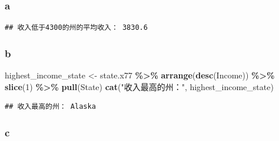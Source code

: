 \documentclass[
]{article}
\newenvironment{Shaded}{\begin{snugshade}}{\end{snugshade}}
\newcommand{\AttributeTok}[1]{\textcolor[rgb]{0.13,0.29,0.53}{#1}}
\newcommand{\DecValTok}[1]{\textcolor[rgb]{0.00,0.00,0.81}{#1}}
\newcommand{\FunctionTok}[1]{\textcolor[rgb]{0.13,0.29,0.53}{\textbf{#1}}}
\newcommand{\NormalTok}[1]{#1}
\newcommand{\OtherTok}[1]{\textcolor[rgb]{0.56,0.35,0.01}{#1}}
\newcommand{\SpecialCharTok}[1]{\textcolor[rgb]{0.81,0.36,0.00}{\textbf{#1}}}
\newcommand{\StringTok}[1]{\textcolor[rgb]{0.31,0.60,0.02}{#1}}
\begin{document}
\subsubsection{a}\label{a-1}

\begin{Shaded}
\end{Shaded}

\begin{verbatim}
## 收入低于4300的州的平均收入： 3830.6
\end{verbatim}

\subsubsection{b}\label{b-1}

\begin{Shaded}
\begin{Highlighting}[]
\NormalTok{highest\_income\_state }\OtherTok{\textless{}{-}}\NormalTok{ state.x77 }\SpecialCharTok{\%\textgreater{}\%} 
  \FunctionTok{arrange}\NormalTok{(}\FunctionTok{desc}\NormalTok{(Income)) }\SpecialCharTok{\%\textgreater{}\%} 
  \FunctionTok{slice}\NormalTok{(}\DecValTok{1}\NormalTok{) }\SpecialCharTok{\%\textgreater{}\%} 
  \FunctionTok{pull}\NormalTok{(State)}
\FunctionTok{cat}\NormalTok{(}\StringTok{"收入最高的州："}\NormalTok{, highest\_income\_state)}
\end{Highlighting}
\end{Shaded}

\begin{verbatim}
## 收入最高的州： Alaska
\end{verbatim}

\subsubsection{c}\label{c-1}
\end{document}
